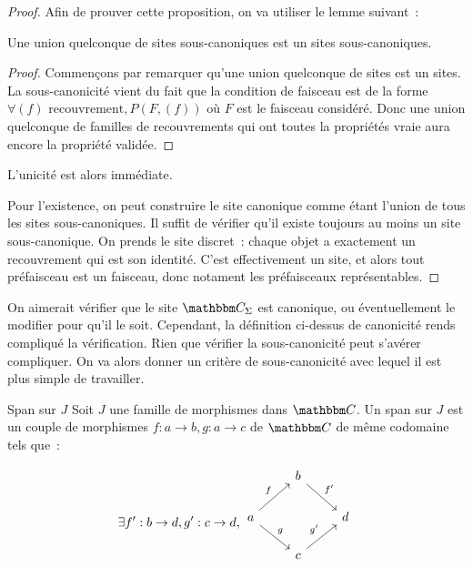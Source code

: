 \begin{proof}
    Afin de prouver cette proposition, on va utiliser le lemme suivant~:

    \begin{lem}
        Une union quelconque de sites sous-canoniques est un sites sous-canoniques.
    \end{lem}
    \begin{proof}
        Commençons par remarquer qu'une union quelconque de sites est un sites.
        La sous-canonicité vient du fait que la condition de faisceau est de la
        forme $\forall (f)\text{ recouvrement}, P(F,(f))$ où $F$ est le
        faisceau considéré.  Donc une union quelconque de familles de
        recouvrements qui ont toutes la propriétés vraie aura encore la
        propriété validée.
    \end{proof}

    L'unicité est alors immédiate.

    Pour l'existence, on peut construire le site canonique comme étant l'union
    de tous les sites sous-canoniques. Il suffit de vérifier qu'il existe toujours
    au moins un site sous-canonique. On prends le site discret~: chaque objet a
    exactement un recouvrement qui est son identité. C'est effectivement un site,
    et alors tout préfaisceau est un faisceau, donc notament les préfaisceaux
    représentables.
\end{proof}

On aimerait vérifier que le site $\C_\Sigma$ est canonique, ou éventuellement le modifier
pour qu'il le soit. Cependant, la définition ci-dessus de canonicité rends compliqué
la vérification. Rien que vérifier la sous-canonicité peut s'avérer compliquer. On
va alors donner un critère de sous-canonicité avec lequel il est plus simple de
travailler.

\begin{defi}{Span sur $J$}
    Soit $J$ une famille de morphismes dans $\C$. Un span sur $J$ est un couple de
    morphismes $f:a\rightarrow b,g:a\rightarrow c$ de $\C$ de même codomaine tels que~:

    \[\exists f':b\rightarrow d, g':c\rightarrow d,\begin{tikzcd}
        & b \arrow[rd, "f'"] & \\
        a \arrow[ru, "f"] \arrow[rd, "g"] & & d \\
        & c \arrow[ru, "g'"] & \\
    \end{tikzcd}\]
\end{defi}

